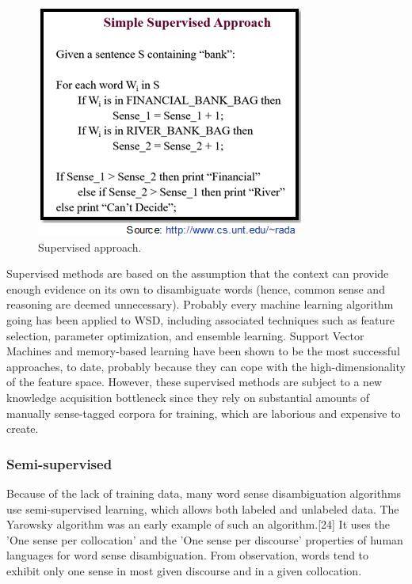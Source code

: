 \begin{figure}[tbh]
	\begin{center}
		\includegraphics[width=\columnwidth]{union(sup3)}
	\end{center}
	\caption{Supervised approach.}
\end{figure}

Supervised methods are based on the assumption that the context can provide enough evidence on its own to disambiguate words (hence, common sense and reasoning are deemed unnecessary). Probably every machine learning algorithm going has been applied to WSD, including associated techniques such as feature selection, parameter optimization, and ensemble learning. Support Vector Machines and memory-based learning have been shown to be the most successful approaches, to date, probably because they can cope with the high-dimensionality of the feature space. However, these supervised methods are subject to a new knowledge acquisition bottleneck since they rely on substantial amounts of manually sense-tagged corpora for training, which are laborious and expensive to create.

\subsubsection*{Semi-supervised}
Because of the lack of training data, many word sense disambiguation algorithms use semi-supervised learning, which allows both labeled and unlabeled data. The Yarowsky algorithm was an early example of such an algorithm.[24] It uses the 'One sense per collocation' and the 'One sense per discourse' properties of human languages for word sense disambiguation. From observation, words tend to exhibit only one sense in most given discourse and in a given collocation.

